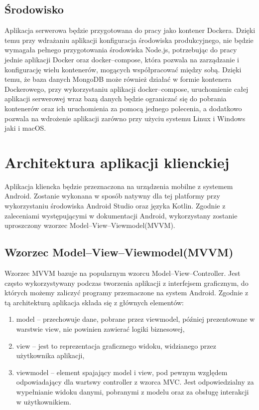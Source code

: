 \documentclass[a4paper,12pt,twoside,openany]{report}
\begin{document}
\subsection{Środowisko}
Aplikacja serwerowa będzie przygotowana do pracy jako kontener Dockera. Dzięki temu przy wdrażaniu aplikacji konfiguracja środowiska produkcyjnego, nie będzie wymagała pełnego przygotowania środowiska Node.js, potrzebując do pracy jednie aplikacji Docker oraz docker--compose, która pozwala na zarządzanie i konfigurację wielu kontenerów, mogących współpracować między sobą. Dzięki temu, że baza danych MongoDB może również działać w formie kontenera Dockerowego, przy wykorzystaniu aplikacji docker--compose, uruchomienie całej aplikacji serwerowej wraz bazą danych będzie ograniczać się do pobrania kontenerów oraz ich uruchomienia za pomocą jednego polecenia, a dodatkowo pozwala na wdrożenie aplikacji zarówno przy użyciu systemu Linux i Windows jaki i macOS.

\section{Architektura aplikacji klienckiej}
Aplikacja kliencka będzie przeznaczona na urządzenia mobilne z systemem Android. Zostanie wykonana w sposób natywny dla tej platformy przy wykorzystaniu środowiska Android Studio oraz języka Kotlin. Zgodnie z zaleceniami występującymi w dokumentacji Android, wykorzystany zostanie uproszczony wzorzec Model–View–Viewmodel(MVVM). 

\subsection{Wzorzec Model–View–Viewmodel(MVVM)}
Wzorzec MVVM bazuje na popularnym wzorcu Model--View--Controller. Jest często wykorzystywany podczas tworzenia aplikacji z interfejsem graficznym, do których możemy zaliczyć programy przeznaczone na system Android. 
Zgodnie z tą architekturą aplikacja składa się z głównych elementów:
\begin{enumerate}
	\item model -- przechowuje dane, pobrane przez viewmodel, później prezentowane w warstwie view, nie powinien zawierać logiki biznesowej,
	\item view -- jest to reprezentacja graficznego widoku, widzianego przez użytkownika aplikacji,
	\item viewmodel -- element spajający model i view, pod pewnym względem odpowiadający dla wartswy controller z wzorca MVC. Jest odpowiedzialny za wypełnianie widoku danymi, pobranymi z modelu oraz za obsługę interakcji w użytkownikiem. 
\end{enumerate}
\end{document}
